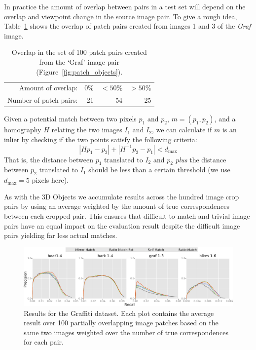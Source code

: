 \documentclass[review]{elsarticle}
\begin{document}
In practice the amount of overlap between pairs in a test set will 
depend on the overlap and viewpoint change in the source image pair.  To 
give a rough idea, Table~\ref{table:overlap} shows the overlap of patch 
pairs created from images 1 and 3 of the \emph{Graf} image.

\begin{table}[htb]
\caption{Overlap in the set of 100 patch pairs created from the `Graf' image pair (Figure~\ref{fig:patch_objects}).}
\label{table:overlap}
	\centering
\begin{tabular}{r*{3}{r}}
\hline
	Amount of overlap: & 0\% & $< 50$\% & $> 50$\%  \\
	\noalign{\smallskip}
	Number of patch pairs: & 21 & 54 & 25 \\
	\hline
\end{tabular}
\end{table}

Given a potential match between two pixels $p_1$ and 
$p_2$, $m = \left(p_1, p_2\right)$, and a homography $H$ relating the two images $I_1$ and $I_2$, we 
can calculate if $m$ is an inlier by checking if the two points satisfy the following criteria:
\begin{equation*}
\left\vert H p_1 - p_2 \right\vert + \left\vert H^{-1}p_2 - p_1 \right\vert < d_{\max}
\end{equation*}
That is, the distance between $p_1$ translated to $I_2$ and $p_2$ 
\emph{plus} the distance between $p_2$ translated to $I_1$ should be 
less than a certain threshold (we use $d_{\max}=5$ pixels here).

As with the 3D Objects we accumulate results across the hundred image crop pairs by using an average weighted by the amount of true correspondences between each cropped pair. This ensures that difficult to match and trivial image pairs have an equal impact on the evaluation result despite the difficult image pairs yielding far less actual matches.
\begin{figure}[t]
    \centering
    \includegraphics[width=\columnwidth]{images/results_acr_patches}
    \caption{Results for the Graffiti dataset. Each plot contains the
average result over 100 partially overlapping image patches based on the same
two images weighted over the number of true correspondences for each pair.}
    \label{fig:patches}
\end{figure}
\end{document}
